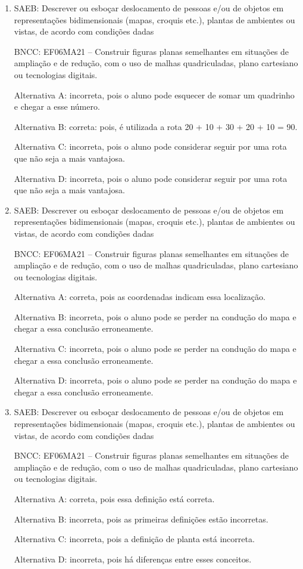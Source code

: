 	\begin{enumerate}

		\item SAEB: Descrever ou esboçar deslocamento de pessoas e/ou de objetos em
representações bidimensionais (mapas, croquis etc.), plantas de
ambientes ou vistas, de acordo com condições dadas

BNCC: EF06MA21 -- Construir figuras planas semelhantes em situações de
ampliação e de redução, com o uso de malhas quadriculadas, plano
cartesiano ou tecnologias digitais.

Alternativa A: incorreta, pois o aluno pode esquecer de somar um
quadrinho e chegar a esse número.

Alternativa B: correta: pois, é utilizada a rota 20 + 10 + 30 + 20 + 10
= 90.

Alternativa C: incorreta, pois o aluno pode considerar seguir por uma
rota que não seja a mais vantajosa.

Alternativa D: incorreta, pois o aluno pode considerar seguir por uma
rota que não seja a mais vantajosa.

		\item 
SAEB: Descrever ou esboçar deslocamento de pessoas e/ou de objetos em
representações bidimensionais (mapas, croquis etc.), plantas de
ambientes ou vistas, de acordo com condições dadas

BNCC: EF06MA21 -- Construir figuras planas semelhantes em situações de
ampliação e de redução, com o uso de malhas quadriculadas, plano
cartesiano ou tecnologias digitais.

Alternativa A: correta, pois as coordenadas indicam essa localização.

Alternativa B: incorreta, pois o aluno pode se perder na condução do
mapa e chegar a essa conclusão erroneamente.

Alternativa C: incorreta, pois o aluno pode se perder na condução do
mapa e chegar a essa conclusão erroneamente.

Alternativa D: incorreta, pois o aluno pode se perder na condução do
mapa e chegar a essa conclusão erroneamente.

		\item SAEB: Descrever ou esboçar deslocamento de pessoas e/ou de objetos em
representações bidimensionais (mapas, croquis etc.), plantas de
ambientes ou vistas, de acordo com condições dadas

BNCC: EF06MA21 -- Construir figuras planas semelhantes em situações de
ampliação e de redução, com o uso de malhas quadriculadas, plano
cartesiano ou tecnologias digitais.

Alternativa A: correta, pois essa definição está correta.

Alternativa B: incorreta, pois as primeiras definições estão incorretas.

Alternativa C: incorreta, pois a definição de planta está incorreta.

Alternativa D: incorreta, pois há diferenças entre esses conceitos.

	\end{enumerate}

